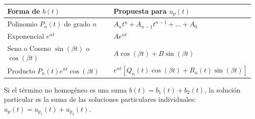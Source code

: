 \begin{table}[h]
\centering
\renewcommand{\arraystretch}{1.5}
\begin{tabular}{|l|l|}
\hline
\textbf{Forma de $b(t)$} & \textbf{Propuesta para $u_p(t)$} \\ \hline
Polinomio $P_n(t)$ de grado $n$ & $A_n t^n + A_{n-1} t^{n-1} + \dots + A_0$ \\ \hline
Exponencial $e^{\alpha t}$ & $A e^{\alpha t}$ \\ \hline
Seno o Coseno $\sin(\beta t)$ o $\cos(\beta t)$ & $A \cos(\beta t) + B \sin(\beta t)$ \\ \hline
Producto $P_n(t) e^{\alpha t} \cos(\beta t)$ & $e^{\alpha t} \left[ Q_n(t) \cos(\beta t) + R_n(t) \sin(\beta t) \right]$ \\ \hline
\end{tabular}
\end{table}

Si el término no homogéneo es una suma $b(t) = b_1(t) + b_2(t)$, la solución particular es la suma de las soluciones particulares individuales: $u_p(t) = u_{p_1}(t) + u_{p_2}(t)$.

